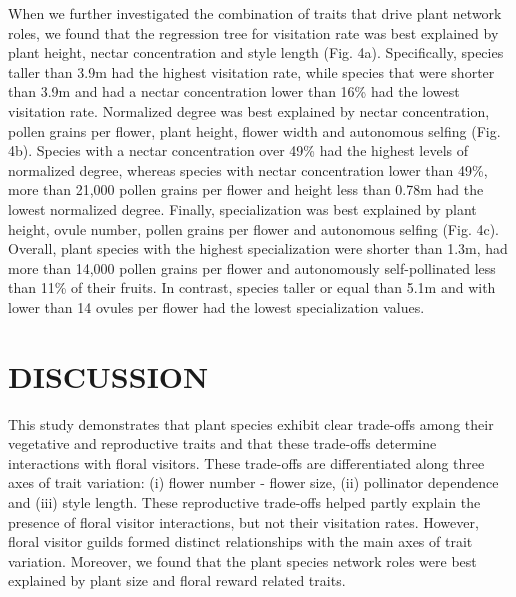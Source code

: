 \documentclass[
  12pt,
  a4paper,
]{article}
\begin{document}
When we further investigated the combination of traits that drive plant network roles, we found that the regression tree for visitation rate was best explained by plant height, nectar concentration and style length (Fig. 4a). Specifically, species taller than 3.9m had the highest visitation rate, while species that were shorter than 3.9m and had a nectar concentration lower than 16\% had the lowest visitation rate. Normalized degree was best explained by nectar concentration, pollen grains per flower, plant height, flower width and autonomous selfing (Fig. 4b). Species with a nectar concentration over 49\% had the highest levels of normalized degree, whereas species with nectar concentration lower than 49\%, more than 21,000 pollen grains per flower and height less than 0.78m had the lowest normalized degree. Finally, specialization was best explained by plant height, ovule number, pollen grains per flower and autonomous selfing (Fig. 4c). Overall, plant species with the highest specialization were shorter than 1.3m, had more than 14,000 pollen grains per flower and autonomously self-pollinated less than 11\% of their fruits. In contrast, species taller or equal than 5.1m and with lower than 14 ovules per flower had the lowest specialization values.

\hypertarget{discussion}{%
\section{DISCUSSION}\label{discussion}}

This study demonstrates that plant species exhibit clear trade-offs among their vegetative and reproductive traits and that these trade-offs determine interactions with floral visitors. These trade-offs are differentiated along three axes of trait variation: (i) flower number - flower size, (ii) pollinator dependence and (iii) style length. These reproductive trade-offs helped partly explain the presence of floral visitor interactions, but not their visitation rates. However, floral visitor guilds formed distinct relationships with the main axes of trait variation. Moreover, we found that the plant species network roles were best explained by plant size and floral reward related traits.
\end{document}
